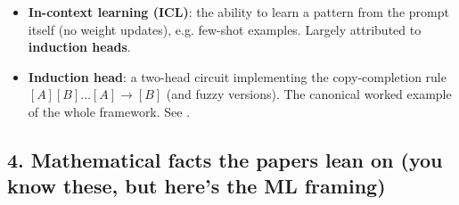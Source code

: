 \begin{itemize}
\item \textbf{In-context learning (ICL)}: the ability to learn a pattern from the prompt itself (no weight updates), e.g. few-shot examples. Largely attributed to \textbf{induction heads}.
\item \textbf{Induction head}: a two-head circuit implementing the copy-completion rule $[A][B]\dots[A]\to[B]$ (and fuzzy versions). The canonical worked example of the whole framework. See \textcite{induction-heads}.
\end{itemize}


\subsection*{4. Mathematical facts the papers lean on (you know these, but here's the ML framing)}

